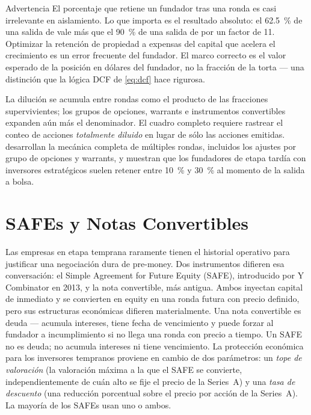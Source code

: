 \begin{admonition}{Advertencia}
El porcentaje que retiene un fundador tras una ronda es casi irrelevante en aislamiento. Lo
que importa es el resultado absoluto: el \qty{62.5}{\percent} de una salida de
 vale más que el \qty{90}{\percent} de una salida de  por
un factor de 11. Optimizar la retención de propiedad a expensas del capital que acelera el
crecimiento es un error frecuente del fundador. El marco correcto es el valor esperado de la
posición en dólares del fundador, no la fracción de la torta --- una distinción que la lógica
DCF de \cref{eq:dcf} hace rigurosa.
\end{admonition}

La dilución se acumula entre rondas como el producto de las fracciones supervivientes; los
grupos de opciones, warrants e instrumentos convertibles expanden aún más el denominador.
El cuadro completo requiere rastrear el conteo de acciones \emph{totalmente diluido} en
lugar de sólo las acciones emitidas.
\textcite{metrick2021venture} desarrollan la mecánica completa de múltiples rondas, incluidos
los ajustes por grupo de opciones y warrants, y muestran que los fundadores de etapa tardía
con inversores estratégicos suelen retener entre \qty{10}{\percent} y \qty{30}{\percent} al
momento de la salida a bolsa.

\section{SAFEs y Notas Convertibles}\label{sec:safes-convertibles}

Las empresas en etapa temprana raramente tienen el historial operativo para justificar una
negociación dura de pre-money. Dos instrumentos difieren esa conversación: el Simple
Agreement for Future Equity (SAFE), introducido por Y Combinator en 2013, y la nota
convertible, más antigua. Ambos inyectan capital de inmediato y se convierten en equity en
una ronda futura con precio definido, pero sus estructuras económicas difieren materialmente.
Una nota convertible es deuda --- acumula intereses, tiene fecha de vencimiento y puede
forzar al fundador a incumplimiento si no llega una ronda con precio a tiempo. Un SAFE no es
deuda; no acumula intereses ni tiene vencimiento. La protección económica para los
inversores tempranos proviene en cambio de dos parámetros: un \emph{tope de valoración}
(la valoración máxima a la que el SAFE se convierte, independientemente de cuán alto se
fije el precio de la Series~A) y una \emph{tasa de descuento} (una reducción porcentual
sobre el precio por acción de la Series~A). La mayoría de los SAFEs usan uno o ambos.

